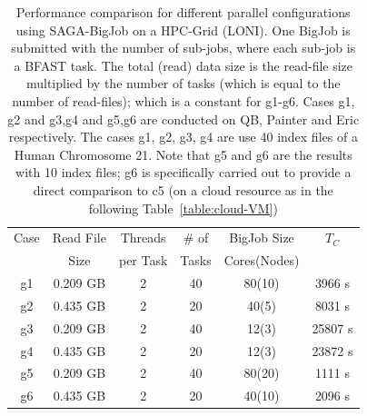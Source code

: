 \documentclass{cpeauth}
\begin{document}
 \begin{table}
 \small
 \begin{tabular}{|c|c|c|c|c|c|} 
 \hline 
Case & Read File & Threads   &  \# of & BigJob Size   &   $T_C$   \\
   & Size& per Task & Tasks  & Cores(Nodes)  & \\
   \hline
g1 & 0.209 GB & 2 &   40 &  80(10) & 3966 s \\
g2 & 0.435 GB & 2 &  20 & 40(5) & 8031 s\\ \hline
g3  & 0.209 GB& 2 & 40  & 12(3) & 25807 s \\
g4 & 0.435 GB& 2 & 20  & 12(3) & 23872 s  \\ \hline
\hline
g5 & 0.209 GB& 2& 40 & 80(20) & 1111 s \\
g6&0.435 GB&2& 20 & 40(10)&2096 s\\
\hline
\end{tabular}
\caption{Performance comparison for different parallel configurations
  using SAGA-BigJob on a HPC-Grid (LONI). One BigJob is submitted with
  the number of sub-jobs, where each sub-job is a BFAST task.  The
  total (read) data size is the read-file size multiplied by the
  number of tasks (which is equal to the number of read-files); which
  is a constant for g1-g6.  Cases g1, g2 and g3,g4 and g5,g6 are
  conducted on QB, Painter and Eric respectively. The cases g1, g2,
  g3, g4 are use 40 index files of a Human Chromosome 21.  Note that
  g5 and g6 are the results with 10 index files; g6 is specifically
  carried out to provide a direct comparison to c5 (on a cloud
  resource as in the following Table~\ref{table:cloud-VM}) }
  
  \label{table:bigjob-loni} 
\end{table}

\end{document}
